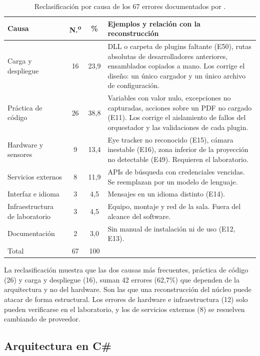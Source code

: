 \begin{table}[H]
\centering
\caption{Reclasificación por causa de los 67 errores documentados por \citet{ibaceta2023evaluacion}.}
\label{tab:reclasificacion}
\small
\begin{tabularx}{\textwidth}{p{4.2cm} c c X}
\toprule
Causa & N.\textsuperscript{o} & \% & Ejemplos y relación con la reconstrucción \\ \midrule
Carga y despliegue & 16 & 23,9 & DLL o carpeta de plugins faltante (E50), rutas absolutas de desarrolladores anteriores, ensamblados copiados a mano. Los corrige el diseño: un único cargador y un único archivo de configuración. \\ \midrule
Práctica de código & 26 & 38,8 & Variables con valor nulo, excepciones no capturadas, acciones sobre un PDF no cargado (E11). Los corrige el aislamiento de fallos del orquestador y las validaciones de cada plugin. \\ \midrule
Hardware y sensores & 9 & 13,4 & Eye tracker no reconocido (E15), cámara inestable (E16), zona inferior de la proyección no detectable (E49). Requieren el laboratorio. \\ \midrule
Servicios externos & 8 & 11,9 & APIs de búsqueda con credenciales vencidas. Se reemplazan por un modelo de lenguaje. \\ \midrule
Interfaz e idioma & 3 & 4,5 & Mensajes en un idioma distinto (E14). \\ \midrule
Infraestructura de laboratorio & 3 & 4,5 & Equipo, montaje y red de la sala. Fuera del alcance del software. \\ \midrule
Documentación & 2 & 3,0 & Sin manual de instalación ni de uso (E12, E13). \\ \midrule
Total & 67 & 100 & \\ \bottomrule
\end{tabularx}
\end{table}

La reclasificación muestra que las dos causas más frecuentes, práctica de código (26) y carga y despliegue (16), suman 42 errores (62,7\%) que dependen de la arquitectura y no del hardware. Son las que una reconstrucción del núcleo puede atacar de forma estructural. Los errores de hardware e infraestructura (12) solo pueden verificarse en el laboratorio, y los de servicios externos (8) se resuelven cambiando de proveedor.

\subsection{Arquitectura en C\#}

